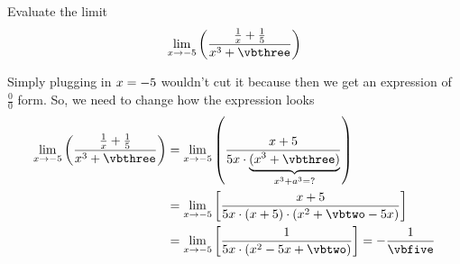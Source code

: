 


\POWER{}\vbtwo
\POWER{}\vbthree
\SQUARE\vbtwo\vbfour
\MULTIPLY{}\vbfive

\question Evaluate the limit \[\lim_{x\to -\vbone}\left(\dfrac{\frac{1}{x} + \frac{1}{\vbone}}{x^3+\vbthree} \right) \]

\watchout

\begin{solution}
  Simply plugging in $x=-5$ wouldn't cut it because then we get an expression of $\frac{0}{0}$ form. So, we need to change how the expression looks 
  \begin{align}
    \lim_{x\to -\vbone}\left( \dfrac{\frac{1}{x} + \frac{1}{\vbone}}{x^3 + \vbthree}\right) &=
    \lim_{x\to -\vbone}\left( \dfrac{x + \vbone}{\vbone x\cdot 
    \underbrace{(x^3 + \vbthree)}_{x^3 + a^3 = ?}}\right) \\
    &= \lim_{x\to -\vbone}\left[ \dfrac{x + \vbone}
    {\vbone x\cdot (x + \vbone)\cdot (x^2 + \vbtwo -\vbone x)}\right] \\
    &= \lim_{x\to -\vbone}\left[ \dfrac{1}{\vbone x\cdot (x^2-\vbone x + \vbtwo) }\right] = 
    -\dfrac{1}{\vbfive}
  \end{align}
\end{solution}

